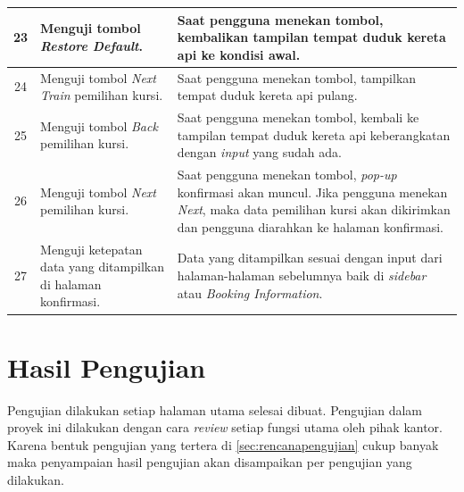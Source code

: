 \begin{longtable}[c]{|c|p{3cm}|p{8cm}|}
        \hline
        23 & Menguji tombol \textit{Restore Default}. & Saat pengguna menekan tombol, kembalikan tampilan tempat duduk kereta api ke kondisi awal.\\
        \hline
        24 & Menguji tombol \textit{Next Train} pemilihan kursi. & Saat pengguna menekan tombol, tampilkan tempat duduk kereta api pulang.\\
        \hline
        25 & Menguji tombol \textit{Back} pemilihan kursi. & Saat pengguna menekan tombol, kembali ke tampilan tempat duduk kereta api keberangkatan dengan \textit{input} yang sudah ada.\\
        \hline
        26 & Menguji tombol \textit{Next} pemilihan kursi. & Saat pengguna menekan tombol, \textit{pop-up} konfirmasi akan muncul. Jika pengguna menekan \textit{Next}, maka data pemilihan kursi akan dikirimkan dan pengguna diarahkan ke halaman konfirmasi.\\
        \hline
        27 & Menguji ketepatan data yang ditampilkan di halaman konfirmasi. & Data yang ditampilkan sesuai dengan input dari halaman-halaman sebelumnya baik di \textit{sidebar} atau \textit{Booking Information}.\\
        \hline
        
\end{longtable}

\section{Hasil Pengujian}
\label{sec:hasilpengujian}

Pengujian dilakukan setiap halaman utama selesai dibuat. Pengujian dalam proyek ini dilakukan dengan cara \textit{review} setiap fungsi utama oleh pihak kantor. Karena bentuk pengujian yang tertera di \ref{sec:rencanapengujian} cukup banyak maka penyampaian hasil pengujian akan disampaikan per pengujian yang dilakukan.

